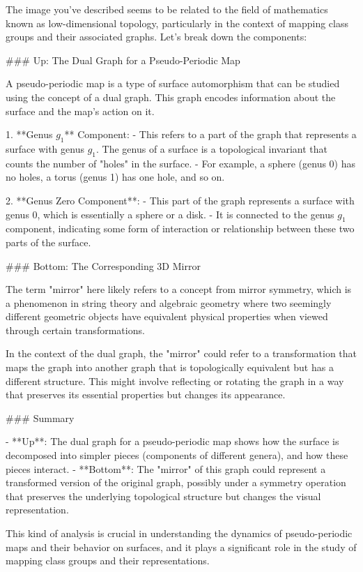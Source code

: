 The image you've described seems to be related to the field of mathematics known as low-dimensional topology, particularly in the context of mapping class groups and their associated graphs. Let's break down the components:

### Up: The Dual Graph for a Pseudo-Periodic Map

A pseudo-periodic map is a type of surface automorphism that can be studied using the concept of a dual graph. This graph encodes information about the surface and the map's action on it.

1. **Genus \(g_1\)** Component:
   - This refers to a part of the graph that represents a surface with genus \(g_1\). The genus of a surface is a topological invariant that counts the number of "holes" in the surface.
   - For example, a sphere (genus 0) has no holes, a torus (genus 1) has one hole, and so on.

2. **Genus Zero Component**:
   - This part of the graph represents a surface with genus 0, which is essentially a sphere or a disk.
   - It is connected to the genus \(g_1\) component, indicating some form of interaction or relationship between these two parts of the surface.

### Bottom: The Corresponding 3D Mirror

The term "mirror" here likely refers to a concept from mirror symmetry, which is a phenomenon in string theory and algebraic geometry where two seemingly different geometric objects have equivalent physical properties when viewed through certain transformations.

In the context of the dual graph, the "mirror" could refer to a transformation that maps the graph into another graph that is topologically equivalent but has a different structure. This might involve reflecting or rotating the graph in a way that preserves its essential properties but changes its appearance.

### Summary

- **Up**: The dual graph for a pseudo-periodic map shows how the surface is decomposed into simpler pieces (components of different genera), and how these pieces interact.
- **Bottom**: The "mirror" of this graph could represent a transformed version of the original graph, possibly under a symmetry operation that preserves the underlying topological structure but changes the visual representation.

This kind of analysis is crucial in understanding the dynamics of pseudo-periodic maps and their behavior on surfaces, and it plays a significant role in the study of mapping class groups and their representations.